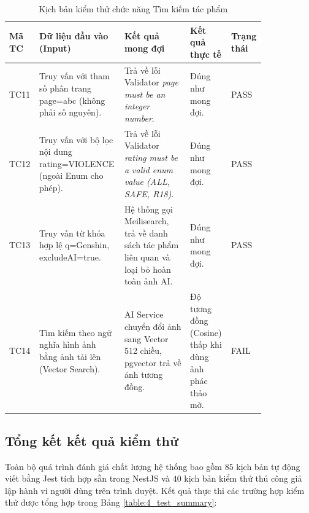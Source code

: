 \begin{table}[h!]
\caption{Kịch bản kiểm thử chức năng Tìm kiếm tác phẩm}
\label{table:4_test_3}
\centering
\small
\renewcommand{\arraystretch}{1.3}
\begin{tabular}{|p{0.08\linewidth}|p{0.25\linewidth}|p{0.25\linewidth}|p{0.15\linewidth}|p{0.1\linewidth}|}
\hline
\textbf{Mã TC} & \textbf{Dữ liệu đầu vào (Input)} & \textbf{Kết quả mong đợi} & \textbf{Kết quả thực tế} & \textbf{Trạng thái} \\ \hline
TC11 & Truy vấn với tham số phân trang page=abc (không phải số nguyên). & Trả về lỗi Validator \textit{page must be an integer number}. & Đúng như mong đợi. & PASS \\ \hline
TC12 & Truy vấn với bộ lọc nội dung rating=VIOLENCE (ngoài Enum cho phép). & Trả về lỗi Validator \textit{rating must be a valid enum value (ALL, SAFE, R18)}. & Đúng như mong đợi. & PASS \\ \hline
TC13 & Truy vấn từ khóa hợp lệ q=Genshin, excludeAI=true. & Hệ thống gọi Meilisearch, trả về danh sách tác phẩm liên quan và loại bỏ hoàn toàn ảnh AI. & Đúng như mong đợi. & PASS \\ \hline
TC14 & Tìm kiếm theo ngữ nghĩa hình ảnh bằng ảnh tải lên (Vector Search). & AI Service chuyển đổi ảnh sang Vector 512 chiều, pgvector trả về ảnh tương đồng. & Độ tương đồng (Cosine) thấp khi dùng ảnh phác thảo mờ. & FAIL \\ \hline
\end{tabular}
\end{table}
\FloatBarrier

\subsection{Tổng kết kết quả kiểm thử}

Toàn bộ quá trình đánh giá chất lượng hệ thống bao gồm $85$ kịch bản tự động viết bằng Jest tích hợp sẵn trong NestJS và $40$ kịch bản kiểm thử thủ công giả lập hành vi người dùng trên trình duyệt. Kết quả thực thi các trường hợp kiểm thử được tổng hợp trong Bảng \ref{table:4_test_summary}:

